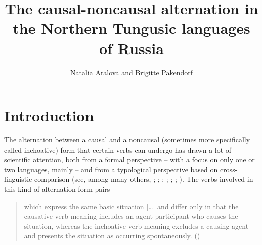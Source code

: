 \documentclass[output=paper,colorlinks,citecolor=brown]{langscibook}
\author{Natalia Aralova\affiliation{Kiel University} and Brigitte Pakendorf\affiliation{Dynamique du Langage, UMR5596, CNRS \& Université de Lyon}}
\title[The causal-noncausal alternation in Northern Tungusic languages]
      {The causal-noncausal alternation in the Northern Tungusic languages of Russia}
\begin{document}
\maketitle

\section{Introduction}\label{section2.1}


The alternation between a causal and a noncausal (sometimes more specifically called inchoative) form that certain verbs can undergo has drawn a lot of scientific attention, both from a formal perspective – with a focus on only one or two languages, mainly  – and from a typological perspective based on cross-linguistic comparison (see, among many others, \citealt{Haspelmath1993}; \citealt{Nichols2004}; \citealt{Comrie2006}; \citealt{Schäfer2009}; \citealt{Koontz2009}; \citealt{Haspelmathetal2014}; \citealt{Levin2015}). The verbs involved in this kind of alternation form pairs
\begin{quote}
    which express the same basic situation […] and differ only in that the causative verb meaning includes an agent participant who causes the situation, whereas the inchoative verb meaning excludes a causing agent and presents the situation as occurring spontaneously. (\citealt[90]{Haspelmath1993})
\end{quote}
\end{document}
